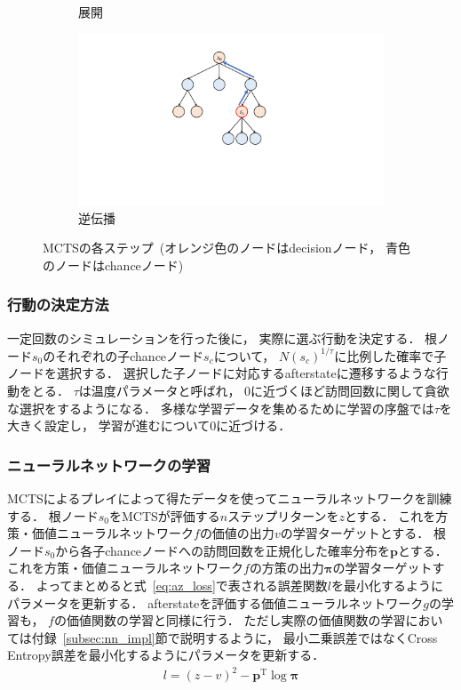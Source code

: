 \begin{figure}
\begin{subfigure}[T]{0.4\columnwidth}
    \caption{展開}
    \label{fig:expand}
  \end{subfigure}
  \hspace{3cm}
  \begin{subfigure}[T]{0.4\columnwidth}
    \centering
    \includegraphics[width=\columnwidth]{figures/backpropagate_.pdf}
    \caption{逆伝播}
    \label{fig:backpropagate}
  \end{subfigure}
  \caption{MCTSの各ステップ~(オレンジ色のノードはdecisionノード， 青色のノードはchanceノード)}
  \label{fig:mcts}
\end{figure}

\subsubsection*{行動の決定方法}
一定回数のシミュレーションを行った後に， 実際に選ぶ行動を決定する．
根ノード$s_0$のそれぞれの子chanceノード$s_c$について， $N(s_c)^{1/\tau}$に比例した確率で子ノードを選択する．
選択した子ノードに対応するafterstateに遷移するような行動をとる．
$\tau$は温度パラメータと呼ばれ， $0$に近づくほど訪問回数に関して貪欲な選択をするようになる．
多様な学習データを集めるために学習の序盤では$\tau$を大きく設定し， 学習が進むについて$0$に近づける．

\subsubsection*{ニューラルネットワークの学習}
MCTSによるプレイによって得たデータを使ってニューラルネットワークを訓練する．
根ノード$s_0$をMCTSが評価する$n$ステップリターンを$z$とする．
これを方策・価値ニューラルネットワーク$f$の価値の出力$v$の学習ターゲットとする．
根ノード$s_0$から各子chanceノードへの訪問回数を正規化した確率分布を$\pmb{p}$とする．
これを方策・価値ニューラルネットワーク$f$の方策の出力$\pmb{\pi}$の学習ターゲットする．
よってまとめると式~\ref{eq:az_loss}で表される誤差関数$l$を最小化するようにパラメータを更新する．
afterstateを評価する価値ニューラルネットワーク$g$の学習も， $f$の価値関数の学習と同様に行う．
ただし実際の価値関数の学習においては付録~\ref{subsec:nn_impl}節で説明するように， 最小二乗誤差ではなくCross Entropy誤差を最小化するようにパラメータを更新する．
\begin{align}
\label{eq:az_loss}
l = (z-v)^2 - \pmb{p}^{\mathrm{T}} \log \pmb{\pi}
\end{align}


